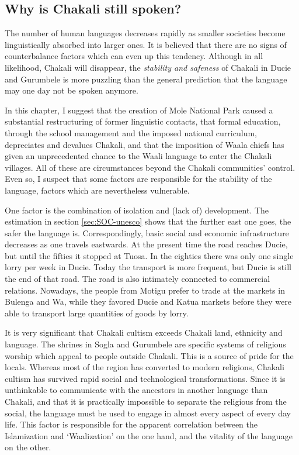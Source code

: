 \subsection{Why is Chakali still spoken?}
\label{sec:SOC-why-cli-still}

The number of  human languages  decreases rapidly as smaller societies become
linguistically absorbed into larger ones. It is believed that  there are no
signs of counterbalance factors which can even up this tendency. Although  in
all likelihood, Chakali will disappear,  the  {\it stability and safeness} of
Chakali in Ducie and Gurumbele is more puzzling than the general prediction that
the  language may one day not be spoken anymore.

In this chapter, I suggest that the creation of Mole National Park caused a
substantial restructuring of former linguistic contacts, that formal education,
through the school management and the imposed national curriculum, depreciates
and devalues Chakali, and that the imposition of Waala chiefs has given an 
unprecedented chance to the Waali language to enter the Chakali
villages. All of these are circumstances  beyond the Chakali communities'
control. Even so, I 
suspect that some factors are responsible for the stability of the language,
factors which are nevertheless vulnerable. 

One factor is the combination of isolation and (lack of) development. The  
estimation in section \ref{sec:SOC-unesco} shows  that the further
east one goes, the safer the language is.  Correspondingly, basic social and
economic infrastructure decreases  as one travels  eastwards. At the
present time the  road reaches Ducie, but until the fifties it stopped at
Tuosa. In the eighties there was only one single lorry per
week in
Ducie. Today the transport is more frequent, but Ducie is still the 
end of that road. The
road is also intimately connected to commercial relations.  Nowadays, the people
from Motigu prefer to trade at the markets in Bulenga and Wa, while they
 favored Ducie and Katua markets before they were able to transport large
quantities
of goods by lorry.

It is very significant that Chakali cultism
exceeds Chakali land, ethnicity
and language. The shrines in Sogla and Gurumbele are specific systems of
religious worship which appeal to people outside Chakali. This is a source of
pride for the locals. Whereas most of  the region has converted to
modern
religions, Chakali cultism has survived rapid social  and technological
transformations. Since it is unthinkable to communicate with the ancestors in
another language than Chakali, and that it is practically impossible to separate
the religious from the social, the language must be used to engage in almost
every aspect of every day life. This factor is responsible for the apparent
correlation between the Islamization and `Waalization' on the one
hand, and the
vitality of the language on the other.  

